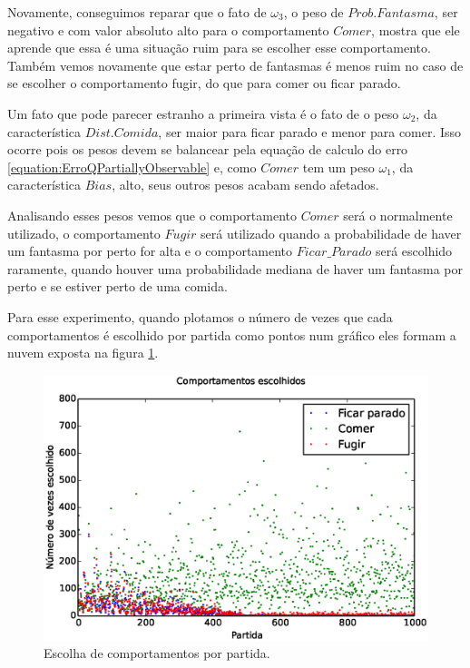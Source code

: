 Novamente, conseguimos reparar que o fato de $ \omega_3 $, o peso de $ Prob.Fantasma $, ser negativo e com valor absoluto alto para o comportamento $ Comer $, mostra que ele aprende que essa é uma situação ruim para se escolher esse comportamento. Também vemos novamente que estar perto de fantasmas é menos ruim no caso de se escolher o comportamento fugir, do que para comer ou ficar parado.

Um fato que pode parecer estranho a primeira vista é o fato de o peso $ \omega_2 $, da característica $ Dist. Comida $, ser maior para ficar parado e menor para comer. Isso ocorre pois os pesos devem se balancear pela equação de calculo do erro \ref{equation:ErroQPartiallyObservable} e, como $ Comer $ tem um peso $ \omega_1 $, da característica $ Bias $, alto, seus outros pesos acabam sendo afetados.

Analisando esses pesos vemos que o comportamento $ Comer $ será o normalmente utilizado, o comportamento $ Fugir $ será utilizado quando a probabilidade de haver um fantasma por perto for alta e o comportamento $ Ficar\_Parado $ será escolhido raramente, quando houver uma probabilidade mediana de haver um fantasma por perto e se estiver perto de uma comida.

Para esse experimento, quando plotamos o número de vezes que cada comportamentos é escolhido por partida como pontos num gráfico eles formam a nuvem exposta na figura \ref{img:3ComportamentosMapaOriginal:ComportamentosEscolhidos}.

\begin{figure}[H]
    \centering
    \includegraphics[width=\linewidth]{images/3_behaviors_original_map/chosen_behaviors}
    \caption{Escolha de comportamentos por partida.}
    \label{img:3ComportamentosMapaOriginal:ComportamentosEscolhidos}
\end{figure}

